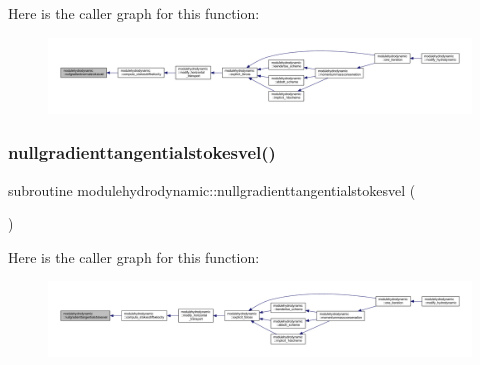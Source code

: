 Here is the caller graph for this function\+:\nopagebreak
\begin{figure}[H]
\begin{center}
\leavevmode
\includegraphics[width=350pt]{namespacemodulehydrodynamic_a4ecf50b9477e7ba12adebe7aef0435c9_icgraph}
\end{center}
\end{figure}
\mbox{\label{namespacemodulehydrodynamic_a0b72f75ffb8470f241904b141a68198e}} 
\subsubsection{\texorpdfstring{nullgradienttangentialstokesvel()}{nullgradienttangentialstokesvel()}}
{\footnotesize\ttfamily subroutine modulehydrodynamic\+::nullgradienttangentialstokesvel (\begin{DoxyParamCaption}{ }\end{DoxyParamCaption})\hspace{0.3cm}{\ttfamily [private]}}

Here is the caller graph for this function\+:\nopagebreak
\begin{figure}[H]
\begin{center}
\leavevmode
\includegraphics[width=350pt]{namespacemodulehydrodynamic_a0b72f75ffb8470f241904b141a68198e_icgraph}
\end{center}
\end{figure}
\mbox{\label{namespacemodulehydrodynamic_a5ec24d04376be68e9e9be33881024200}} 
